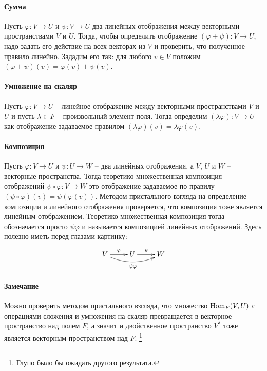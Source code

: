 \paragraph{Сумма}

Пусть $\varphi\colon V\to U$ и $\psi \colon V\to U$ два линейных отображения между векторными пространствами $V$ и $U$.
Тогда, чтобы определить отображение $(\varphi+\psi)\colon V\to U$, надо задать его действие на всех векторах из $V$ и проверить, что полученное правило линейно.
Зададим его так: для любого $v\in V$ положим $(\varphi + \psi)(v) = \varphi(v) + \psi(v)$.

\paragraph{Умножение на скаляр}

Пусть $\varphi\colon V\to U$ -- линейное отображение между векторными пространствами $V$ и $U$ и пусть $\lambda \in F$ -- произвольный элемент поля.
Тогда определим $(\lambda \varphi)\colon V\to U$ как отображение задаваемое правилом $(\lambda\varphi)(v) = \lambda \varphi(v)$.

\paragraph{Композиция}

Пусть $\varphi\colon V\to U$ и $\psi \colon U \to W$ -- два линейных отображения, а $V$, $U$ и $W$ -- векторные пространства.
Тогда теоретико множественная композиция отображений $\psi\circ \varphi\colon V\to W$ это отображение задаваемое по правилу $(\psi\circ \varphi)(v) = \psi(\varphi(v))$.
Методом пристального взгляда на определение композиции и линейного отображения проверяется, что композиция тоже является линейным отображением.
Теоретико множественная композиция тогда обозначается просто $\psi\varphi$ и называется композицией линейных отображений.
Здесь полезно иметь перед глазами картинку:
\[
\xymatrix{
  {V}\ar[r]^{\varphi}\ar@/_10pt/[rr]_{\psi\varphi}&{U}\ar[r]^{\psi}&{W}
}
\]

\paragraph{Замечание}

Можно проверить методом пристального взгляда, что множество $\operatorname{Hom}_F(V,U)$ с операциями сложения и умножения на скаляр превращается в векторное пространство над полем $F$, а значит и двойственное пространство $V^*$ тоже является векторным пространством над $F$.%
\footnote{Глупо было бы ожидать другого результата.}

